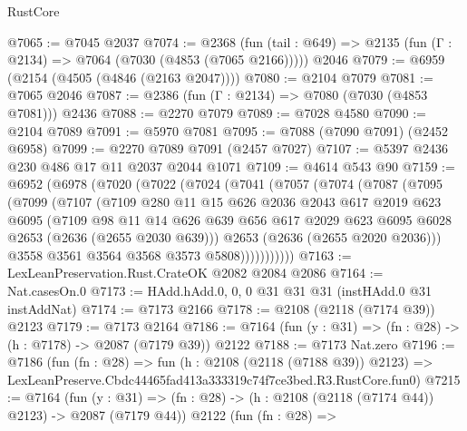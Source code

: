 \begin{lexlean}{RustCore}
\begin{coremodule}
@7065 := @7045 @2037
@7074 := @2368
    (fun (tail : @649) => @2135 (fun (Γ : @2134) => @7064 (@7030 (@4853 (@7065 @2166)))))
    @2046
@7079 := @6959 (@2154 (@4505 (@4846 (@2163 @2047))))
@7080 := @2104 @7079
@7081 := @7065 @2046
@7087 := @2386 (fun (Γ : @2134) => @7080 (@7030 (@4853 @7081))) @2436
@7088 := @2270 @7079
@7089 := @7028 @4580
@7090 := @2104 @7089
@7091 := @5970 @7081
@7095 := @7088 (@7090 @7091) (@2452 @6958)
@7099 := @2270 @7089 @7091 (@2457 @7027)
@7107 := @5397 @2436 @230 @486 @17 @11 @2037 @2044 @1071
@7109 := @4614 @543 @90
@7159 := @6952
    (@6978
      (@7020
        (@7022
          (@7024
            (@7041
              (@7057
                (@7074
                  (@7087
                    (@7095
                      (@7099
                        (@7107
                          (@7109
                            @280
                            @11
                            @15
                            @626
                            @2036
                            @2043
                            @617
                            @2019
                            @623
                            @6095
                            (@7109
                              @98
                              @11
                              @14
                              @626
                              @639
                              @656
                              @617
                              @2029
                              @623
                              @6095
                              @6028
                              @2653
                              (@2636 (@2655 @2030 @639)))
                            @2653
                            (@2636 (@2655 @2020 @2036)))
                          @3558
                          @3561
                          @3564
                          @3568
                          @3573
                          @5808)))))))))))
@7163 := LexLeanPreservation.Rust.CrateOK @2082 @2084 @2086
@7164 := Nat.casesOn.{0}
@7173 := HAdd.hAdd.{0, 0, 0} @31 @31 @31 (instHAdd.{0} @31 instAddNat)
@7174 := @7173 @2166
@7178 := @2108 (@2118 (@7174 @39)) @2123
@7179 := @7173 @2164
@7186 := @7164 (fun (y : @31) => (fn : @28) -> (h : @7178) -> @2087 (@7179 @39)) @2122
@7188 := @7173 Nat.zero
@7196 := @7186
    (fun (fn : @28) =>
    fun (h : @2108 (@2118 (@7188 @39)) @2123) =>
    LexLeanPreserve.Cbdc44465fad413a333319c74f7ce3bed.R3.RustCore.fun0)
@7215 := @7164
    (fun (y : @31) => (fn : @28) -> (h : @2108 (@2118 (@7174 @44)) @2123) -> @2087 (@7179 @44))
    @2122
    (fun (fn : @28) =>

\end{coremodule}
\end{lexlean}
